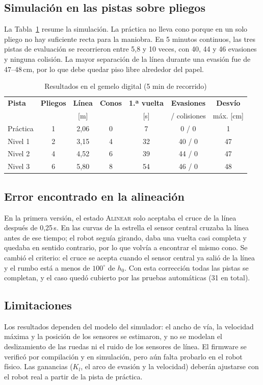 \documentclass[10pt,a4paper,twocolumn]{article}
\begin{document}
\subsection{Simulación en las pistas sobre pliegos}
La Tabla~\ref{tab:sim} resume la simulación. La práctica no lleva cono porque en un solo pliego no hay suficiente recta para la maniobra. En 5 minutos continuos, las tres pistas de evaluación se recorrieron entre 5,8 y 10 veces, con 40, 44 y 46 evasiones y ninguna colisión. La mayor separación de la línea durante una evasión fue de 47--48\,cm, por lo que debe quedar piso libre alrededor del papel.

\begin{table}[!t]
\caption{Resultados en el gemelo digital (5 min de recorrido)}\label{tab:sim}
\centering\scriptsize
\setlength{\tabcolsep}{3.2pt}
\begin{tabular}{@{}lcccccc@{}}
\toprule
\textbf{Pista} & \textbf{Pliegos} & \textbf{Línea} & \textbf{Conos} & \textbf{1.ª vuelta} & \textbf{Evasiones} & \textbf{Desvío}\\
 & & [m] & & [s] & / colisiones & máx. [cm]\\
\midrule
Práctica & 1 & 2,06 & 0 & 7 & 0 / 0 & 1\\
Nivel 1 & 2 & 3,15 & 4 & 32 & 40 / 0 & 47\\
Nivel 2 & 4 & 4,52 & 6 & 39 & 44 / 0 & 47\\
Nivel 3 & 6 & 5,80 & 8 & 54 & 46 / 0 & 48\\
\bottomrule
\end{tabular}
\end{table}

\subsection{Error encontrado en la alineación}
En la primera versión, el estado \textsc{Alinear} solo aceptaba el cruce de la línea después de 0,25\,s. En las curvas de la estrella el sensor central cruzaba la línea antes de ese tiempo; el robot seguía girando, daba una vuelta casi completa y quedaba en sentido contrario, por lo que volvía a encontrar el mismo cono. Se cambió el criterio: el cruce se acepta cuando el sensor central ya salió de la línea y el rumbo está a menos de $100^\circ$ de $h_0$. Con esta corrección todas las pistas se completan, y el caso quedó cubierto por las pruebas automáticas (31 en total).

\subsection{Limitaciones}
Los resultados dependen del modelo del simulador: el ancho de vía, la velocidad máxima y la posición de los sensores se estimaron, y no se modelan el deslizamiento de las ruedas ni el ruido de los sensores de línea. El firmware se verificó por compilación y en simulación, pero aún falta probarlo en el robot físico. Las ganancias ($K_l$, el arco de evasión y la velocidad) deberán ajustarse con el robot real a partir de la pista de práctica.
\end{document}
